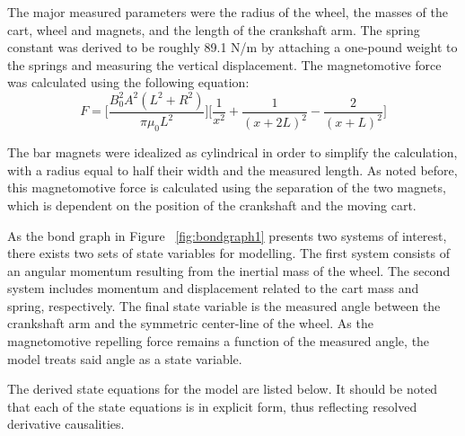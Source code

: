 \documentclass[notitlepage,10pt]{report}
\begin{document}
\begin{multicols}{2}
The major measured parameters were the radius of the wheel, the masses of the cart, wheel and magnets, and the length of the crankshaft arm. The spring constant was derived to be roughly 89.1 N/m by attaching a one-pound weight to the springs and measuring the vertical displacement. The magnetomotive force was calculated using the following equation: 
\begin{equation}
   F=\bigg[\frac{B_0^2A^2(L^2+R^2)}{\pi\mu_0L^2}\bigg]\bigg[\frac{1}{x^2} + \frac{1}{(x+2L)^2} - \frac{2}{(x+L)^2}\bigg]
\end{equation}

The bar magnets were idealized as cylindrical in order to simplify the calculation, with a radius equal to half their width and the measured length. As noted before, this magnetomotive force is calculated using the separation of the two magnets, which is dependent on the position of the crankshaft and the moving cart.

As the bond graph in Figure ~\ref{fig:bondgraph1} presents two systems of interest, there exists two sets of state variables for modelling. The first system consists of an angular momentum resulting from the inertial mass of the wheel. The second system includes momentum and displacement related to the cart mass and spring, respectively. The final state variable is the measured angle between the crankshaft arm and the symmetric center-line of the wheel. As the magnetomotive repelling force remains a function of the measured angle, the model treats said angle as a state variable. 

The derived state equations for the model are listed below. It should be noted that each of the state equations is in explicit form, thus reflecting resolved derivative causalities.


\end{multicols}
\end{document}
